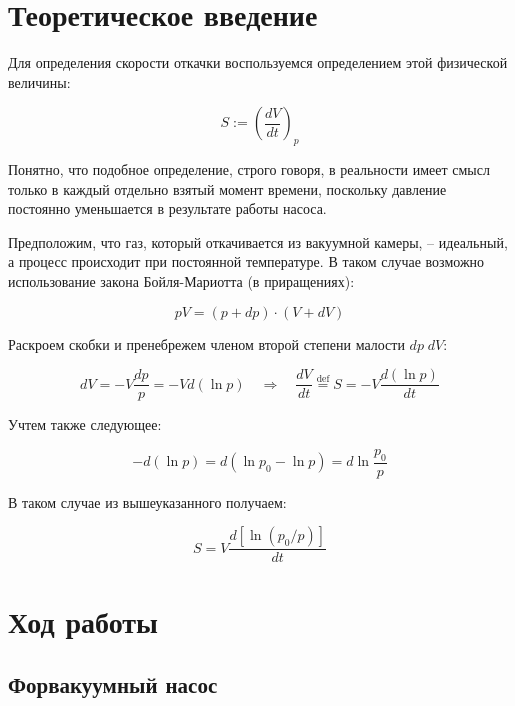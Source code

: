 \documentclass[a4paper, 12pt]{article}
\newcommand{\qrq}
{\ensuremath{\quad \Rightarrow \quad}} %
\begin{document}
\section{Теоретическое введение}

Для определения скорости откачки воспользуемся определением этой физической величины:

\begin{equation}
	S := \left(\frac{dV}{dt}\right)_p
	\label{eq:speed_def}
\end{equation}

Понятно, что подобное определение, строго говоря, в реальности имеет смысл только в каждый отдельно взятый момент времени, поскольку давление постоянно уменьшается в результате работы насоса.

Предположим, что газ, который откачивается из вакуумной камеры, -- идеальный, а процесс происходит при постоянной температуре. В таком случае возможно использование закона Бойля-Мариотта (в приращениях):

\begin{equation*}
	pV = (p + dp) \cdot (V + dV)
	\label{eq:Boil}
\end{equation*}

Раскроем скобки и пренебрежем членом второй степени малости $dp \; dV$:

\begin{equation*}
	dV = -V \frac{dp}{p} = -V d (\ln p) \qrq \frac{dV}{dt} \stackrel{\text{def}}{=} S = -V \frac{d(\ln p)}{dt}
\end{equation*}

Учтем также следующее:

\begin{equation*}
	-d (\ln p) = d (\ln p_0 - \ln p) = d \ln \frac{p_0}{p}
\end{equation*}

В таком случае из вышеуказанного получаем:

\begin{equation}
	S = V \frac{d[\ln (p_0/p)]}{dt}
	\label{eq:speed_use}
\end{equation}

\section{Ход работы}

\subsection{Форвакуумный насос}
\label{sc:foreline}
\end{document}
